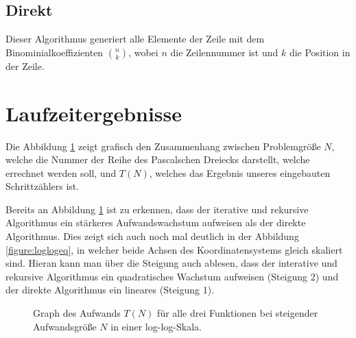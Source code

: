 \documentclass[paper=a4, fontsize=11pt]{scrartcl} %
\numberwithin{equation}{section} %
\numberwithin{figure}{section} %
\numberwithin{table}{section} %
\begin{document}
\subsection{Direkt}
Dieser Algorithmus generiert alle Elemente der Zeile mit dem Binominialkoeffizienten
$\binom{n}{k}$, wobei $n$ die Zeilennummer ist und $k$ die Position in der Zeile.

\section{Laufzeitergebnisse}

Die Abbildung \ref{figure:loglog} zeigt grafisch den Zusammenhang zwischen
Problemgr\"o{\ss}e $N$, welche die Nummer der Reihe des Pascalschen Dreiecks darstellt,
welche errechnet werden soll, und $T(N)$, welches das Ergebnis unseres eingebauten
Schrittz\"ahlers ist.

Bereits an Abbildung \ref{figure:loglog} ist zu erkennen, dass der iterative und rekursive
Algorithmus ein st\"arkeres Aufwandswachstum aufweisen als der direkte Algorithmus.
Dies zeigt sich auch noch mal deutlich in der Abbildung \ref{figure:loglogeq},
in welcher beide Achsen des Koordinatensystems gleich skaliert sind. Hieran kann
man \"uber die Steigung auch ablesen, dass der interative und rekursive Algorithmus
ein quadratisches Wachstum aufweisen (Steigung 2) und der direkte Algorithmus
ein lineares (Steigung 1).

\begin{figure}[h]
  \centering
  \caption{Graph des Aufwands $T(N)$ f\"ur alle drei Funktionen bei steigender Aufwandsgr\"o{\ss}e $N$ in einer log-log-Skala.}
  \label{figure:loglog}
\end{figure}
\end{document}
